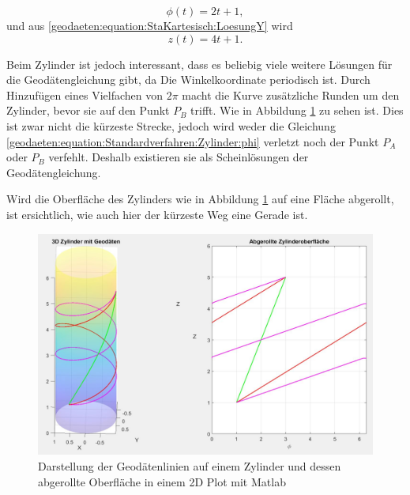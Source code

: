 \begin{equation}
	\phi(t) = 2t + 1 ,
\end{equation}
und aus \eqref{geodaeten:equation:StaKartesisch:LoesungY} wird
\begin{equation}
	z(t) = 4t + 1 .
\end{equation}

Beim Zylinder ist jedoch interessant, dass es beliebig viele weitere Lösungen für die Geodätengleichung gibt, da Die Winkelkoordinate periodisch ist.
Durch Hinzufügen eines Vielfachen von $2\pi$ macht die Kurve zusätzliche Runden um den Zylinder, bevor sie auf den Punkt $P_B$ trifft. Wie in Abbildung \ref{geodaeten:figure:Linienelemente:Zylinder:figure1} zu sehen ist.
Dies ist zwar nicht die kürzeste Strecke, jedoch wird weder die Gleichung \eqref{geodaeten:equation:Standardverfahren:Zylinder:phi} verletzt noch der Punkt $P_A$ oder $P_B$ verfehlt.
Deshalb existieren sie als Scheinlösungen der Geodätengleichung.

Wird die Oberfläche des Zylinders wie in Abbildung \ref{geodaeten:figure:Linienelemente:Zylinder:figure1} auf eine Fläche abgerollt, ist ersichtlich, wie auch hier der kürzeste Weg eine Gerade ist.  

\begin{figure}
	\centering
	\includegraphics[width=14cm]{papers/geodaeten/Abbildungen/Standardverfahren/Zylinder}
	\caption{Darstellung der Geodätenlinien auf einem Zylinder und dessen abgerollte Oberfläche in einem 2D Plot mit Matlab}
	\label{geodaeten:figure:Linienelemente:Zylinder:figure1}
\end{figure}
